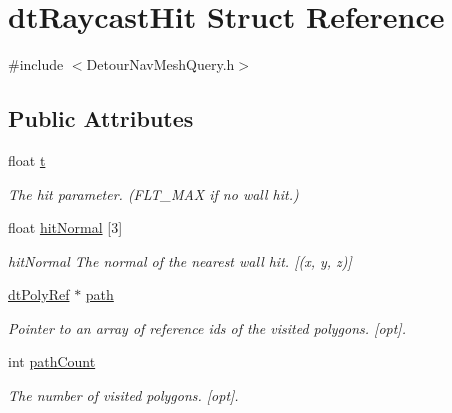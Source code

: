 \hypertarget{structdtRaycastHit}{}\section{dt\+Raycast\+Hit Struct Reference}
\label{structdtRaycastHit}


{\ttfamily \#include $<$Detour\+Nav\+Mesh\+Query.\+h$>$}

\subsection*{Public Attributes}
\begin{DoxyCompactItemize}
\item 
\mbox{\label{structdtRaycastHit_a890c2216ded62ca0932cd6ee27cc7ea9}} 
float \hyperlink{structdtRaycastHit_a890c2216ded62ca0932cd6ee27cc7ea9}{t}
\begin{DoxyCompactList}\small\item\em The hit parameter. (F\+L\+T\+\_\+\+M\+AX if no wall hit.) \end{DoxyCompactList}\item 
\mbox{\label{structdtRaycastHit_af087f98b3d63e0d9fb3608feb5212647}} 
float \hyperlink{structdtRaycastHit_af087f98b3d63e0d9fb3608feb5212647}{hit\+Normal} \mbox{[}3\mbox{]}
\begin{DoxyCompactList}\small\item\em hit\+Normal The normal of the nearest wall hit. \mbox{[}(x, y, z)\mbox{]} \end{DoxyCompactList}\item 
\mbox{\label{structdtRaycastHit_a74c116063677ff1d0fc2ffbc9a651c3d}} 
\hyperlink{group__detour_gab4e0b2257a670c1a800057999612b466}{dt\+Poly\+Ref} $\ast$ \hyperlink{structdtRaycastHit_a74c116063677ff1d0fc2ffbc9a651c3d}{path}
\begin{DoxyCompactList}\small\item\em Pointer to an array of reference ids of the visited polygons. \mbox{[}opt\mbox{]}. \end{DoxyCompactList}\item 
\mbox{\label{structdtRaycastHit_ae1b9b3893e653ce5a1ecf8d8415f5a93}} 
int \hyperlink{structdtRaycastHit_ae1b9b3893e653ce5a1ecf8d8415f5a93}{path\+Count}
\begin{DoxyCompactList}\small\item\em The number of visited polygons. \mbox{[}opt\mbox{]}. \end{DoxyCompactList}\item 

\end{DoxyCompactItemize}
